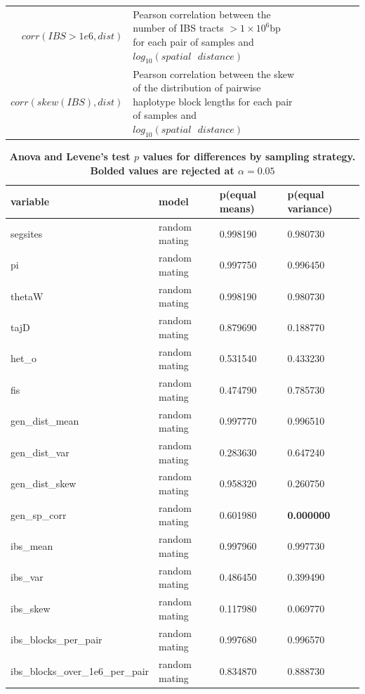 \documentclass[11pt,twoside,lineno]{preprint}
\begin{document}
\begin{table}
\begin{tabular}{rllrrrrr}
$corr(IBS>1e6,dist)$ & \makecell[l]{Pearson correlation between the number of IBS tracts $> 1\times10^6$bp \\for each pair of samples and $log_{10}(spatial\text{ }distance)$} \\
$corr(skew(IBS),dist)$ & \makecell[l]{Pearson correlation between the skew of the distribution of pairwise haplotype\\ block lengths for each pair of samples and $log_{10}(spatial\text{ }distance)$} \\
\end{tabular}
\label{table:sumstats}
\end{table}


\begin{table}[htbp]
\tiny
\centering
\caption{\bf Anova and Levene's test $p$ values for differences by sampling strategy. Bolded values are rejected at $\alpha=0.05$}
\begin{tableminipage}{\textwidth}
\begin{tabularx}{\textwidth}{XXXX}
  \hline
 variable & model & p(equal means) & p(equal variance) \\ 
  \hline
segsites & random mating & 0.998190 & 0.980730 \\ 
pi & random mating & 0.997750 & 0.996450 \\ 
thetaW & random mating & 0.998190 & 0.980730 \\ 
tajD & random mating & 0.879690 & 0.188770 \\ 
het\_o & random mating & 0.531540 & 0.433230 \\ 
fis & random mating & 0.474790 & 0.785730 \\ 
gen\_dist\_mean & random mating & 0.997770 & 0.996510 \\ 
gen\_dist\_var & random mating & 0.283630 & 0.647240 \\ 
gen\_dist\_skew & random mating & 0.958320 & 0.260750 \\ 
gen\_sp\_corr & random mating & 0.601980 &\textbf{0.000000} \\ 
ibs\_mean & random mating & 0.997960 & 0.997730 \\ 
ibs\_var & random mating & 0.486450 & 0.399490 \\ 
ibs\_skew & random mating & 0.117980 & 0.069770 \\ 
ibs\_blocks\_per\_pair & random mating & 0.997680 & 0.996570 \\ 
ibs\_blocks\_over\_1e6\_per\_pair & random mating & 0.834870 & 0.888730 \\ 

\end{tabularx}
\end{tableminipage}
\end{table}
\end{document}
